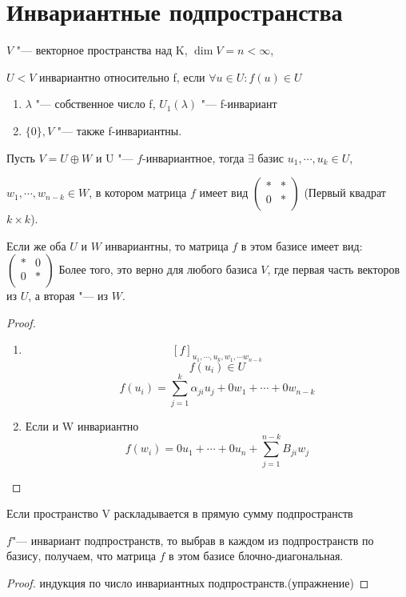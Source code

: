 \section{Инвариантные подпространства}
\begin{Def}

$V$ "--- векторное пространства над K, $\dim V = n < \infty$,

$U < V$ инвариантно относительно f, если  $\forall u \in U \colon f(u) \in U$

\end{Def}

\begin{exmp}

\begin{enumerate}
\item 
$\lambda$ "--- собственное число f, $U_1(\lambda)$ "--- f-инвариант

\item 
$\{0\}, V$ "--- также f-инвариантны. 
\end{enumerate}
\end{exmp} 

\begin{theorem}{}
Пусть $V = U \oplus W$ и U "--- $f$-инвариантное, тогда
$\exists$ базис $u_1, \cdots, u_k \in U$, 

$w_1, \cdots, w_{n - k} \in W$, в котором матрица $f$
имеет вид 
$\begin{pmatrix}
*&*\\
0&*\\
\end{pmatrix}$
(Первый квадрат $k \times k$).

Если же оба $U$ и $W$ инвариантны, то матрица $f$ в этом базисе имеет вид:
$
\begin{pmatrix}
*&0\\
0&*\\
\end{pmatrix}
$
Более того, это верно для любого базиса $V$, где первая часть векторов из $U$, а вторая "--- из $W$.
\end{theorem}
\begin{proof}
\begin{enumerate}
    \item
     $$[f]_{u_1, \cdots,u_k, w_1, \cdots w_{n - k}}$$
     $$f(u_i) \in U$$
     $$f(u_i) = \sum_{j = 1}^{k} \alpha_{ji}u_j + 0w_1 + \cdots + 0w_{n - k}$$
     \item Если и W инвариантно
     $$f(w_i) = 0u_1 + \cdots + 0u_n + \sum_{j = 1}^{n - k}B_{ji}w_j$$
\end{enumerate}
\end{proof}
\begin{conseq}
Если пространство V раскладывается в прямую сумму подпространств

$f$"--- инвариант подпространств, то выбрав в каждом из
подпространств по базису, получаем, что матрица $f$ в этом
базисе блочно-диагональная.
\end{conseq}
\begin{proof}
индукция по число инвариантных подпространств.(упражнение)
\end{proof}

